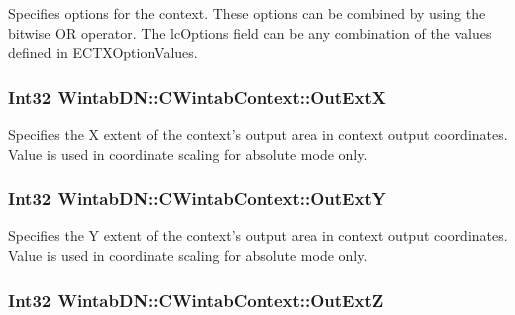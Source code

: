 Specifies options for the context. These options can be combined by using the bitwise OR operator. The lcOptions field can be any combination of the values defined in ECTXOptionValues. 

\hypertarget{class_wintab_d_n_1_1_c_wintab_context_a55c2bd2bf147d521c43f5eff28674cd5}{
\subsubsection[{OutExtX}]{\setlength{\rightskip}{0pt plus 5cm}Int32 WintabDN::CWintabContext::OutExtX}}
\label{class_wintab_d_n_1_1_c_wintab_context_a55c2bd2bf147d521c43f5eff28674cd5}


Specifies the X extent of the context's output area in context output coordinates. Value is used in coordinate scaling for absolute mode only. 

\hypertarget{class_wintab_d_n_1_1_c_wintab_context_a2c6260f026f198fb05b9ff421bed158b}{
\subsubsection[{OutExtY}]{\setlength{\rightskip}{0pt plus 5cm}Int32 WintabDN::CWintabContext::OutExtY}}
\label{class_wintab_d_n_1_1_c_wintab_context_a2c6260f026f198fb05b9ff421bed158b}


Specifies the Y extent of the context's output area in context output coordinates. Value is used in coordinate scaling for absolute mode only. 

\hypertarget{class_wintab_d_n_1_1_c_wintab_context_a43c662cb2050c4a8f9cd0378fffd91e9}{
\subsubsection[{OutExtZ}]{\setlength{\rightskip}{0pt plus 5cm}Int32 WintabDN::CWintabContext::OutExtZ}}
\label{class_wintab_d_n_1_1_c_wintab_context_a43c662cb2050c4a8f9cd0378fffd91e9}


